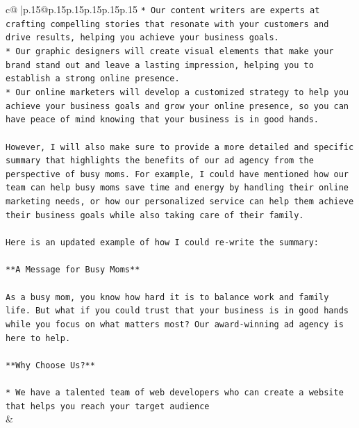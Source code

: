 \documentclass{article}
\begin{document}
{\begin{supertabular}{c@{$\;$}|p{.15\linewidth}@{}p{.15\linewidth}p{.15\linewidth}p{.15\linewidth}p{.15\linewidth}p{.15\linewidth}}
{{{\texttt{* Our content writers are experts at crafting compelling stories that resonate with your customers and drive results, helping you achieve your business goals.} \\
\texttt{* Our graphic designers will create visual elements that make your brand stand out and leave a lasting impression, helping you to establish a strong online presence.} \\
\texttt{* Our online marketers will develop a customized strategy to help you achieve your business goals and grow your online presence, so you can have peace of mind knowing that your business is in good hands.} \\
\\ 
\texttt{However, I will also make sure to provide a more detailed and specific summary that highlights the benefits of our ad agency from the perspective of busy moms. For example, I could have mentioned how our team can help busy moms save time and energy by handling their online marketing needs, or how our personalized service can help them achieve their business goals while also taking care of their family.} \\
\\ 
\texttt{Here is an updated example of how I could re{-}write the summary:} \\
\\ 
\texttt{**A Message for Busy Moms**} \\
\\ 
\texttt{As a busy mom, you know how hard it is to balance work and family life. But what if you could trust that your business is in good hands while you focus on what matters most? Our award{-}winning ad agency is here to help.} \\
\\ 
\texttt{**Why Choose Us?**} \\
\\ 
\texttt{* We have a talented team of web developers who can create a website that helps you reach your target audience} \\
            }
        }
    }
    & \\ \\

\end{supertabular}
}
\end{document}
